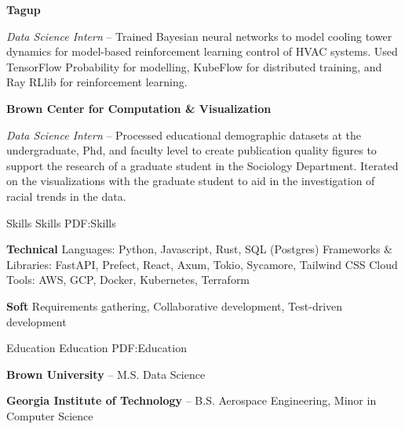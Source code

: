\documentclass[letterpaper,MMMyyyy,nonstopmode]{simpleresumecv}
\begin{document}
\begin{Body}
\BigGap

\Entry \textbf{Tagup}

\Gap

\BulletItem \textit{Data Science Intern}
\hfill
{} -- 
\SubBulletItem
Trained Bayesian neural networks to model cooling tower dynamics for model-based reinforcement learning control of HVAC systems. Used TensorFlow Probability for modelling, KubeFlow for distributed training, and Ray RLlib for reinforcement learning.

\BigGap

\Entry \textbf{Brown Center for Computation \& Visualization}

\Gap
  
\BulletItem \textit{Data Science Intern}
\hfill
{} -- 
\SubBulletItem
Processed educational demographic datasets at the undergraduate, Phd, and faculty level to create publication quality figures to support the research of a graduate student in the Sociology Department. Iterated on the visualizations with the graduate student to aid in the investigation of racial trends in the data.



\Section
{Skills}
{Skills}
{PDF:Skills}

\Entry \textbf{Technical}
  \BulletItem Languages: Python, Javascript, Rust, SQL (Postgres)
  \BulletItem Frameworks & Libraries: FastAPI, Prefect, React, Axum, Tokio, Sycamore, Tailwind CSS
  \BulletItem Cloud Tools: AWS, GCP, Docker, Kubernetes, Terraform

\BigGap

\Entry \textbf{Soft}
\BulletItem Requirements gathering, Collaborative development, Test-driven development

\Section
{Education}
{Education}
{PDF:Education}

\Entry \textbf{Brown University}
\hfill
{} -- 
\BulletItem M.S. Data Science

\Entry \textbf{Georgia Institute of Technology}
\hfill
{} -- 
\BulletItem B.S. Aerospace Engineering, Minor in Computer Science


\end{Body}
\end{document}
